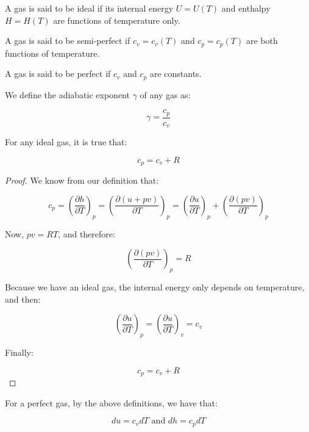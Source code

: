 \documentclass{article}
\begin{document}
\begin{definition}
    A gas is said to be ideal if its internal energy $U = U(T)$ and enthalpy $H = H(T)$ are functions of temperature only.
\end{definition}

\begin{definition}
    A gas is said to be semi-perfect if $c_v = c_v(T)$ and $c_p = c_p(T)$ are both functions of temperature.
\end{definition}

\begin{definition}
    A gas is said to be perfect if $c_v$ and $c_p$ are constants.
\end{definition}

\begin{definition}
    We define the adiabatic exponent $\gamma$ of any gas as:

    \[ \gamma = \frac{c_p}{c_v} \]
\end{definition}

\begin{proposition}
    For any ideal gas, it is true that:

    \[ c_p = c_v + R \]
\end{proposition}

\begin{proof}
    We know from our definition that:

    \[ c_p = \left(\frac{\partial h}{\partial T}\right)_p = \left(\frac{\partial (u + pv)}{\partial T}\right)_p = \left(\frac{\partial u}{\partial T}\right)_p + \left(\frac{\partial (pv)}{\partial T}\right)_p\]

    Now, $pv = RT$, and therefore:

    \[ \left(\frac{\partial (pv)}{\partial T}\right)_p = R\]

    Because we have an ideal gas, the internal energy only depends on temperature, and then:

    \[ \left(\frac{\partial u}{\partial T}\right)_p = \left(\frac{\partial u}{\partial T}\right)_v = c_v \]

    Finally:

    \[ c_p = c_v + R \]
\end{proof}

\begin{proposition}
    For a perfect gas, by the above definitions, we have that:

    \[ du = c_vdT \text{   and   } dh = c_pdT \]
\end{proposition}
\end{document}
